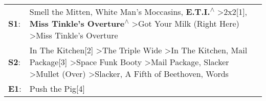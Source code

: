 \begin{supertabular}{p{0.03\textwidth}p{0.92\textwidth}}
 \textbf{S1}:  &                                                                                                                                              Smell the Mitten\textsuperscript{}, \enspace White Man's Moccasins\textsuperscript{}, \enspace \textbf{E.T.I.\textsuperscript{$\wedge$}} \textgreater \enspace 2x2[1]\textsuperscript{}, \enspace \textbf{Miss Tinkle's Overture\textsuperscript{$\wedge$}} \textgreater \enspace Got Your Milk (Right Here)\textsuperscript{} \textgreater \enspace Miss Tinkle's Overture\textsuperscript{}  \enspace  \\
 \textbf{S2}:  &  In The Kitchen[2]\textsuperscript{} \textgreater \enspace The Triple Wide\textsuperscript{} \textgreater \enspace In The Kitchen\textsuperscript{}, \enspace Mail Package[3]\textsuperscript{} \textgreater \enspace Space Funk Booty\textsuperscript{} \textgreater \enspace Mail Package\textsuperscript{}, \enspace Slacker\textsuperscript{} \textgreater \enspace Mullet (Over)\textsuperscript{} \textgreater \enspace Slacker\textsuperscript{}, \enspace A Fifth of Beethoven\textsuperscript{}, \enspace Words\textsuperscript{}  \enspace  \\
 \textbf{E1}:  &                                                                                                                                                                                                                                                                                                                                                                                                                                                                                                          Push the Pig[4]\textsuperscript{}  \enspace  \\
\end{supertabular}

